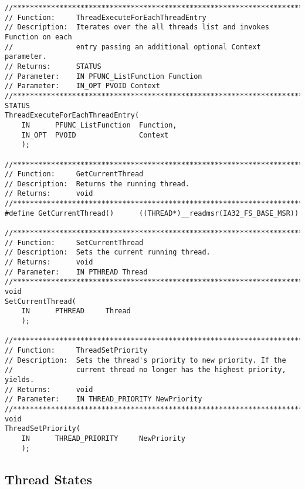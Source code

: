 \begin{appendices}
\begin{lstlisting}[caption={Thread Private Interface},label={lst:ThPrivateFuncs}]
//******************************************************************************
// Function:     ThreadExecuteForEachThreadEntry
// Description:  Iterates over the all threads list and invokes Function on each
//               entry passing an additional optional Context parameter.
// Returns:      STATUS
// Parameter:    IN PFUNC_ListFunction Function
// Parameter:    IN_OPT PVOID Context
//******************************************************************************
STATUS
ThreadExecuteForEachThreadEntry(
    IN      PFUNC_ListFunction  Function,
    IN_OPT  PVOID               Context
    );

//******************************************************************************
// Function:     GetCurrentThread
// Description:  Returns the running thread.
// Returns:      void
//******************************************************************************
#define GetCurrentThread()      ((THREAD*)__readmsr(IA32_FS_BASE_MSR))

//******************************************************************************
// Function:     SetCurrentThread
// Description:  Sets the current running thread.
// Returns:      void
// Parameter:    IN PTHREAD Thread
//******************************************************************************
void
SetCurrentThread(
    IN      PTHREAD     Thread
    );

//******************************************************************************
// Function:     ThreadSetPriority
// Description:  Sets the thread's priority to new priority. If the
//               current thread no longer has the highest priority, yields.
// Returns:      void
// Parameter:    IN THREAD_PRIORITY NewPriority
//******************************************************************************
void
ThreadSetPriority(
    IN      THREAD_PRIORITY     NewPriority
    );
\end{lstlisting}

\subsection{Thread States}
\label{sect:ThreadStates}


\end{appendices}
